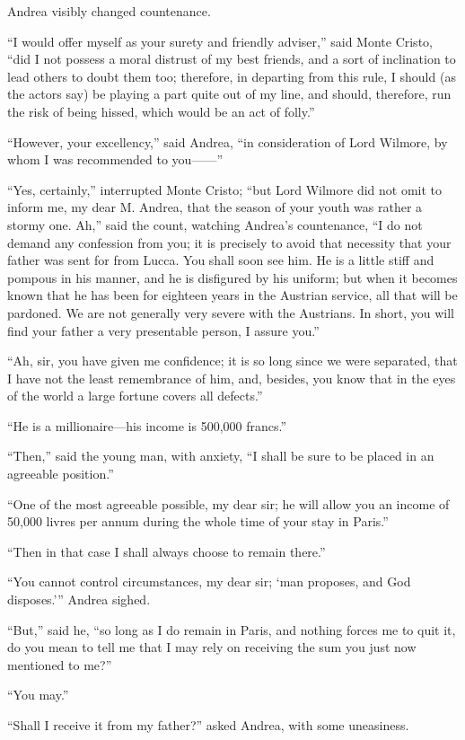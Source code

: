 Andrea visibly changed countenance.

“I would offer myself as your surety and friendly adviser,” said Monte
Cristo, “did I not possess a moral distrust of my best friends, and a
sort of inclination to lead others to doubt them too; therefore, in
departing from this rule, I should (as the actors say) be playing a
part quite out of my line, and should, therefore, run the risk of being
hissed, which would be an act of folly.”

“However, your excellency,” said Andrea, “in consideration of Lord
Wilmore, by whom I was recommended to you——”

“Yes, certainly,” interrupted Monte Cristo; “but Lord Wilmore did not
omit to inform me, my dear M. Andrea, that the season of your youth was
rather a stormy one. Ah,” said the count, watching Andrea’s
countenance, “I do not demand any confession from you; it is precisely
to avoid that necessity that your father was sent for from Lucca. You
shall soon see him. He is a little stiff and pompous in his manner, and
he is disfigured by his uniform; but when it becomes known that he has
been for eighteen years in the Austrian service, all that will be
pardoned. We are not generally very severe with the Austrians. In
short, you will find your father a very presentable person, I assure
you.”

“Ah, sir, you have given me confidence; it is so long since we were
separated, that I have not the least remembrance of him, and, besides,
you know that in the eyes of the world a large fortune covers all
defects.”

“He is a millionaire—his income is 500,000 francs.”

“Then,” said the young man, with anxiety, “I shall be sure to be placed
in an agreeable position.”

“One of the most agreeable possible, my dear sir; he will allow you an
income of 50,000 livres per annum during the whole time of your stay in
Paris.”

“Then in that case I shall always choose to remain there.”

“You cannot control circumstances, my dear sir; ‘man proposes, and God
disposes.’” Andrea sighed.

“But,” said he, “so long as I do remain in Paris, and nothing forces me
to quit it, do you mean to tell me that I may rely on receiving the sum
you just now mentioned to me?”

“You may.”

“Shall I receive it from my father?” asked Andrea, with some
uneasiness.

